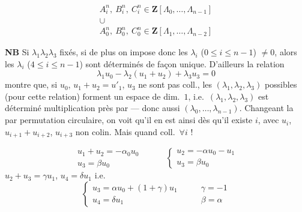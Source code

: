 \documentclass[11pt,a4paper]{article}
\begin{document}
\[
\begin{array}{c}
A_i^n,\ B_i^n,\ C_i^n \in \mathbf{Z}[\Lambda_0, \ldots, \Lambda_{n-1}] \\
\cup \\
A_0^n,\ B_0^n,\ C_0^n \in \mathbf{Z}[\Lambda_1, \ldots, \Lambda_{n-2}]
\end{array}
\]


\textbf{NB} Si $\lambda_1 \lambda_2 \lambda_3$ fixés, \struck{\ill{}}
 si de plus on impose donc les $\lambda_i$
($0 \leqslant i \leqslant n-1$) $\neq 0$, alors les $\lambda_i$
($4 \leqslant i \leqslant n-1$) sont déterminés de façon unique. D'ailleurs la
relation
\[
\lambda_1 u_0 - \lambda_2 (u_1 + u_2) + \lambda_3 u_3 = 0
\]
montre que, si $u_0$, $u_1 + u_2 = u'_1$, $u_3$ ne sont pas coll., les
$(\lambda_1, \lambda_2, \lambda_3)$ possibles (pour cette relation) forment un
espace de dim.~$1$, i.e.\ $(\lambda_1, \lambda_2, \lambda_3)$ est déterminé
 multiplication près par \ill{} --- donc aussi
$(\lambda_0, \ldots, \lambda_{n-1})$. Changeant la  par
permutation circulaire, on voit qu'il en est ainsi dès qu'il existe $i$, avec
$u_i$, $u_{i+1} + u_{i+2}$, $u_{i+3}$ non colin. Mais quand \ill{} \ill{}
\struck{\ill{}} \ill{} coll.\ $\forall i$ !




\[
\begin{array}{ll}
u_1 + u_2 = -\alpha_0 u_0 & \\
u_3 = \beta u_0 &
\end{array}
\qquad
\left\lbrace
\begin{array}{l}
u_2 = -\alpha u_0 - u_1 \\
u_3 = \beta u_0
\end{array}
\right.
\]
\struck{$\alpha$} $u_2 + u_3 = \gamma u_1$, \quad $u_4 = \delta u_1$ \quad i.e.
\[
\left\lbrace
\begin{array}{l}
u_3 = \alpha u_0 + (1 + \gamma) u_1 \\
u_4 = \delta u_1
\end{array}
\right.
\qquad
\begin{array}{l}
\gamma = -1 \\
\beta = \alpha
\end{array}
\]
\end{document}
